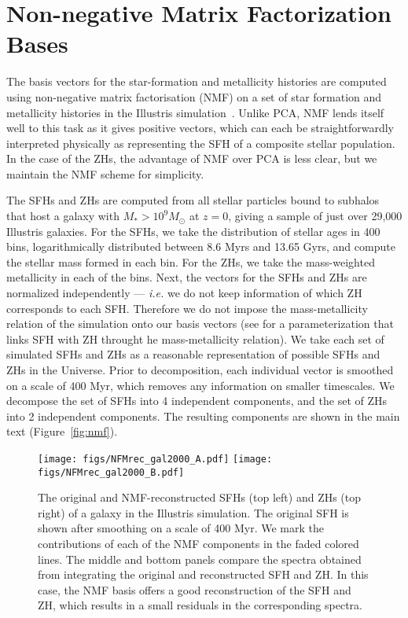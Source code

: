 \section{Non-negative Matrix Factorization Bases} \label{sec:nmf}
The basis vectors for the star-formation and metallicity histories are computed
using non-negative matrix factorisation (NMF) on a set of star formation and
metallicity histories in the Illustris 
simulation~\citep{vogelsberger2014, genel2014, nelson2015}.
Unlike PCA, NMF lends itself well to this task as it gives positive vectors,
which can each be straightforwardly interpreted physically as representing the
SFH of a composite stellar population. 
In the case of the ZHs, the advantage of NMF over PCA is less clear, but we
maintain the NMF scheme for simplicity. 

The SFHs and ZHs are computed from all stellar particles bound to subhalos
that host a galaxy with $M_* > 10^9 M_\odot$ at $z=0$, giving a sample of just
over 29,000 Illustris galaxies. 
For the SFHs, we take the distribution of stellar ages in 400 bins,
logarithmically distributed between 8.6 Myrs and 13.65 Gyrs, and compute the
stellar mass formed in each bin. For the ZHs, we take the mass-weighted
metallicity in each of the bins. 
Next, the vectors for the SFHs and ZHs are normalized independently ---
\emph{i.e.} we do not keep information of which ZH corresponds to each SFH.
Therefore we do not impose the mass-metallicity relation of the simulation onto
our basis vectors (see \citealt{thorne2021} for a parameterization that links
SFH with ZH throught he mass-metallicity relation). 
We take each set of simulated SFHs and ZHs as a reasonable representation of
possible SFHs and ZHs in the Universe. 
Prior to decomposition, each individual vector is smoothed on a scale of 400
Myr, which removes any information on smaller timescales. 
We decompose the set of SFHs into 4 independent components, and the set of ZHs
into 2 independent components. 
The resulting components are shown in the main text (Figure~\ref{fig:nmf}). 

\begin{figure}
\begin{center}
\texttt{[image: figs/NFMrec\_gal2000\_A.pdf]}
\texttt{[image: figs/NFMrec\_gal2000\_B.pdf]}
    \caption{
    The original and NMF-reconstructed SFHs (top left) and ZHs (top right) of a
    galaxy in the Illustris simulation. 
    The original SFH is shown after smoothing on a scale of 400 Myr. 
    We mark the contributions of each of the NMF components in the faded
    colored lines. 
    The middle and bottom panels compare the spectra obtained from integrating
    the original and reconstructed SFH and ZH. 
    In this case, the NMF basis offers a good reconstruction of the SFH and ZH,
    which results in a small residuals in the corresponding spectra.
    }\label{fig:nmf0}
\end{center}
\end{figure}

